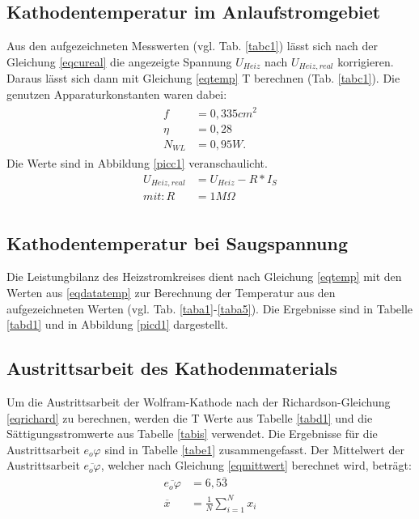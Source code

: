 \subsection{Kathodentemperatur im Anlaufstromgebiet}
Aus den aufgezeichneten Messwerten (vgl. Tab. \ref{tabc1}) lässt sich nach der Gleichung \ref{eqcureal}
die angezeigte Spannung $U_{Heiz}$ nach $U_{Heiz,real}$ korrigieren. Daraus lässt sich dann mit 
Gleichung \ref{eqtemp} T berechnen (Tab. \ref{tabc1}). Die genutzen Apparaturkonstanten waren dabei:
\begin{align}
\begin{split}
f&=0,335cm^2 \label{eqdatatemp}\\
\eta&=0,28\\
N_{WL}&=0,95W .
\end{split}
\end{align} 
Die Werte sind in Abbildung \ref{picc1} veranschaulicht.
\begin{align}
U_{Heiz,real}&=U_{Heiz}-R*I_S \label{eqcureal}\\
mit: R&=1M\Omega \\
\end{align}
 
\FloatBarrier
\subsection{Kathodentemperatur bei Saugspannung}
Die Leistungbilanz des Heizstromkreises dient nach Gleichung \ref{eqtemp} mit den Werten aus \ref{eqdatatemp}
zur Berechnung der Temperatur aus den aufgezeichneten Werten (vgl. Tab. \ref{taba1}-\ref{taba5}). Die Ergebnisse
sind in Tabelle \ref{tabd1} und in Abbildung \ref{picd1} dargestellt. 
 
\FloatBarrier
\subsection{Austrittsarbeit des Kathodenmaterials}
Um die Austrittsarbeit der Wolfram-Kathode nach der Richardson-Gleichung \ref{eqrichard} zu berechnen,
werden die T Werte aus Tabelle \ref{tabd1} und die Sättigungsstromwerte aus Tabelle \ref{tabis}
verwendet. Die Ergebnisse für die Austrittsarbeit $e_o\varphi$ sind in Tabelle \ref{tabe1} zusammengefasst.
Der Mittelwert der Austrittsarbeit $\overline{e_o\varphi}$, welcher nach Gleichung \ref{eqmittwert} berechnet
wird, beträgt:
\begin{align}
\overline{e_o\varphi}&=6{,}5\overline{3} \label{eqphi} \\
\overline{x}&=\frac{1}{N}\sum\limits_{i=1}^N x_i \label{eqmittwert}
\end{align}

\FloatBarrier

